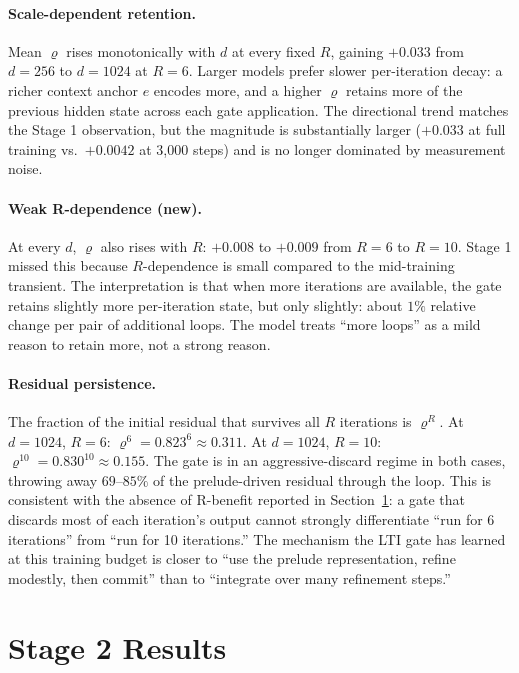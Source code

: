 \documentclass{article}
\begin{document}
\paragraph{Scale-dependent retention.}
Mean $\varrho$ rises monotonically with $d$ at every fixed $R$, gaining $+0.033$ from $d{=}256$ to $d{=}1024$ at $R{=}6$. Larger models prefer slower per-iteration decay: a richer context anchor $e$ encodes more, and a higher $\varrho$ retains more of the previous hidden state across each gate application. The directional trend matches the Stage 1 observation, but the magnitude is substantially larger ($+0.033$ at full training vs.\ $+0.0042$ at 3{,}000 steps) and is no longer dominated by measurement noise.

\paragraph{Weak R-dependence (new).}
At every $d$, $\varrho$ also rises with $R$: $+0.008$ to $+0.009$ from $R{=}6$ to $R{=}10$. Stage 1 missed this because $R$-dependence is small compared to the mid-training transient. The interpretation is that when more iterations are available, the gate retains slightly more per-iteration state, but only slightly: about $1\%$ relative change per pair of additional loops. The model treats ``more loops'' as a mild reason to retain more, not a strong reason.

\paragraph{Residual persistence.}
The fraction of the initial residual that survives all $R$ iterations is $\varrho^R$. At $d{=}1024$, $R{=}6$: $\varrho^6 = 0.823^6 \approx 0.311$. At $d{=}1024$, $R{=}10$: $\varrho^{10} = 0.830^{10} \approx 0.155$. The gate is in an aggressive-discard regime in both cases, throwing away $69$--$85\%$ of the prelude-driven residual through the loop. This is consistent with the absence of R-benefit reported in Section~\ref{sec:stage2}: a gate that discards most of each iteration's output cannot strongly differentiate ``run for 6 iterations'' from ``run for 10 iterations.'' The mechanism the LTI gate has learned at this training budget is closer to ``use the prelude representation, refine modestly, then commit'' than to ``integrate over many refinement steps.''

\section{Stage 2 Results}
\label{sec:stage2}
\end{document}

